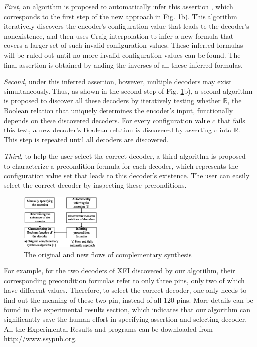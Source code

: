 \documentclass[journal]{IEEEtran}
\begin{document}
\emph{First},
an algorithm is proposed to automatically infer this assertion \cite{ShengYuShen:iccad11},
which corresponds to the first step of the new approach in Fig. \ref{flow}b).
This algorithm iteratively discovers the encoder's configuration value that leads to the decoder's nonexistence,
and then uses Craig interpolation to infer a new formula that covers a larger set of such invalid configuration values.
These inferred formulas will be ruled out until no more invalid configuration values can be found.
The final assertion is obtained by anding the inverses of all these inferred formulas.

\emph{Second},
under this inferred assertion,
however,
multiple decoders may exist simultaneously.
Thus,
as shown in the second step of Fig. \ref{flow}b),
a second algorithm is proposed to discover all these decoders by iteratively testing whether $\mathbb{R}$,
the Boolean relation that uniquely determines the encoder's input,
functionally depends\cite{funcdep} on these discovered decoders.
For every configuration value $c$ that fails this test,
a new decoder's Boolean relation is discovered by asserting $c$ into $\mathbb{R}$.
This step is repeated until all decoders are discovered.

\emph{Third},
to help the user select the correct decoder,
a third algorithm is proposed to characterize a precondition formula for each decoder,
which represents the configuration value set that leads to this decoder's existence.
The user can easily select the correct decoder by inspecting these preconditions.

\begin{figure}[t]
\begin{center}
\includegraphics[width=0.35\textwidth]{flow}
\end{center}
\caption{The original and new flows of complementary synthesis}
  \label{flow}
\end{figure}

For example,
for the two decoders of XFI discovered by our algorithm,
their corresponding precondition formulas refer to only three pins,
only two of which have different values.
Therefore,
to select the correct decoder,
one only needs to find out the meaning of these two pin,
instead of all 120 pins.
More details can be found in the experimental results section,
which indicates that our algorithm can significantly save the human effort in specifying assertion and selecting decoder.
All the Experimental Results and programs can be downloaded from \url{http://www.ssypub.org}.
\end{document}
